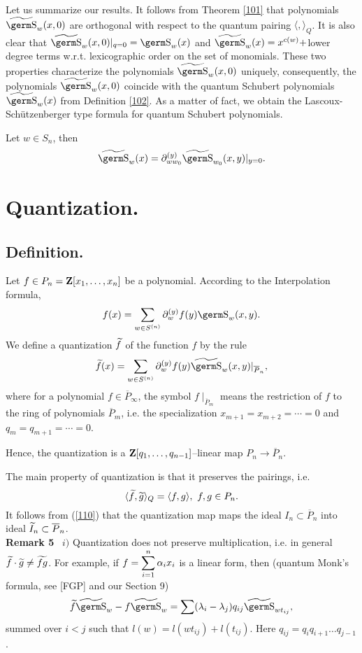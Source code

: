 {{Let us summarize our results. It follows from Theorem \ref{101} 
that polynomials 
$\wt{\s}_w(x,0)$ are orthogonal with respect to the quantum pairing $\langle 
,\rangle_Q$. It is also clear that $\wt{\s}_w(x,0)|_{q=0}=\s_w(x)$ and
$\wt{\s}_w(x)=x^{c(w)}+$lower degree terms w.r.t. lexicographic order 
on the set of monomials. These 
two properties characterize the polynomials $\wt{\s}_w(x,0)$ uniquely, 
consequently, the polynomials $\wt{\s}_w(x,0)$ coincide with the quantum 
Schubert polynomials $\wt{\s}_w(x)$ from Definition \ref{102}. As a matter of 
fact, we obtain the Lascoux-Sch\"utzenberger type formula for quantum 
Schubert polynomials.

\begin{th}\label{t7} Let $w\in S_n$, then
$$\wt{\s}_w(x)=\partial_{ww_0}^{(y)}\wt{\s}_{w_0}(x,y)|_{y=0}.
$$
\end{th}

\section{Quantization.}

\subsection{Definition.}

Let $f\in P_n={\bf Z}[x_1,\ldots ,x_n]$ be a polynomial. According to the
Interpolation formula,
$$f(x)=\sum_{w\in S^{(n)}}\partial_w^{(y)}f(y)\s_w(x,y).
$$
We define a quantization $\widetilde f$ of the function $f$ by the rule
\begin{equation}\wt f(x)=\sum_{w\in S^{(n)}}\partial_w^{(y)}f(y)
\wt{\s}_w(x,y)|_{\overline P_n},\label{51}
\end{equation}
where for a polynomial $f\in\overline P_{\infty}$, the symbol 
$f\mid_{\overline P_m}$ means the restriction of $f$ to the ring of
polynomials $\overline P_m$,
i.e. the specialization $x_{m+1}=x_{m+2}=\cdots =0$ and $q_m=q_{m+1}=
\cdots =0$.

Hence, the quantization is a ${\bf Z}[q_1,\ldots ,q_{n-1}]$--linear 
map $P_n\to\overline P_n$.

The main property of quantization is that it preserves the pairings, i.e.
\begin{equation}\langle\wt f,\wt g\rangle_Q=\langle f,g\rangle , \ 
f,g\in P_n. \label{110}
\end{equation}
It follows from (\ref{110}) that the quantization map maps the ideal 
$I_n\subset\overline P_n$ into ideal $\widetilde I_n\subset\overline P_n$.
\smallskip \\ 
{\bf Remark 5} \ $i)$ Quantization does not preserve multiplication, i.e. in 
general $\widetilde f\cdot \widetilde g\ne \widetilde{fg}$. For example, if 
$f=\displaystyle\sum_{i=1}^n\alpha_ix_i$ is a linear form, then
(quantum Monk's formula, see [FGP] and our Section 9)
$$\wt f\wt{\s}_w-\wt{f\s_w}=\sum (\ld_i-\ld_j)q_{ij}\wt{\s}_{wt_{ij}},
$$
summed over $i<j$ such that $l(w)=l(wt_{ij})+l(t_{ij})$. Here 
$q_{ij}=q_iq_{i+1}\ldots q_{j-1}$.

}}
